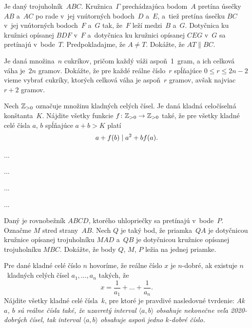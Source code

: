 {%
 Je daný trojuholník~$ABC$. Kružnica~$\Gamma$ prechádzajúca bodom~$A$ pretína úsečky $AB$ a~$AC$ po rade v~jej vnútorných bodoch~$D$ a~$E$, a~tiež pretína úsečku $BC$ v~jej vnútorných bodoch~$F$ a~$G$ tak, že~$F$ leží medzi~$B$ a~$G$. Dotyčnica ku kružnici opísanej $BDF$ v~$F$ a~dotyčnica ku kružnici opísanej $CEG$ v~$G$ sa pretínajú v~bode~$T$. Predpokladajme, že $A \ne T$. Dokážte, že $AT \parallel BC$.}

{%
 Je daná množina~$n$ cukríkov, pričom každý váži aspoň~1~gram, a ich celková váha je~$2n$ gramov. Dokážte, že pre každé reálne číslo~$r$ spĺňajúce $0 \leq r \leq 2n-2$ vieme vybrať cukríky, ktorých celková váha je aspoň~$r$ gramov, avšak najviac $r+2$ gramov.}

{%
 Nech ${\Bbb Z}_{>0}$ označuje množinu kladných celých čísel. Je daná kladná celočíselná konštanta~$K$. Nájdite všetky funkcie $f\colon {\Bbb Z}_{>0} \rightarrow {\Bbb Z}_{>0}$ také, že pre všetky kladné celé čísla $a$, $b$ spĺňajúce $a+b>K$ platí
$$
\abovedisplayskip0pt
a+f(b) \mid a^2+bf(a).
\belowdisplayskip0pt
$$}

{%
...}

{%
...}

{%
...}

{%
...}

{%
Daný je rovnobežník $ABCD$, ktorého uhlopriečky sa pretínajú v~bode~$P$. Označme $M$ stred strany~$AB$. Nech $Q$ je taký bod, že priamka~$QA$ je dotyčnicou kružnice opísanej trojuholníku $MAD$ a~$QB$ je dotyčnicou kružnice opísanej trojuholníku $MBC$. Dokážte, že body $Q$, $M$, $P$ ležia na jednej priamke.}

{%
Pre dané kladné celé číslo $n$ hovoríme, že reálne číslo $x$ je $n$-dobré, ak existuje $n$~kladných celých čísel $a_1,\dots,a_n$ takých, že
$$
x= \frac1{a_1}+\dots+\frac1{a_n}.
$$
Nájdite všetky kladné celé čísla~$k$, pre ktoré je pravdivé nasledovné tvrdenie: {\it Ak $a$, $b$ sú reálne čísla také, že uzavretý interval $\langle a,b\rangle$ obsahuje nekonečne veľa 2020-dobrých čísel, tak interval $\langle a,b\rangle$ obsahuje aspoň jedno $k$-dobré číslo.}}

